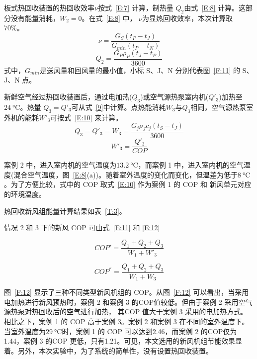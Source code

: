 板式热回收装置的热回收效率$\nu$按式~\ref{E:7} 计算，制热量 $Q_2$由式~\ref{E:8} 计算。这部分没有能量消耗，$W_2 = 0$。在式~\ref{E:8} 中， $\nu$为显热回收效率，本次计算取 70\%。
\begin{equation}\label{E:7}
	\nu = \frac{G_S (t_P - t_J)}{G_{min} (t_P - t_N)} 
\end{equation}
\begin{equation}\label{E:8}
	Q_2 = \frac{G_P \rho_P (t_J - t_P)}{3600} 
\end{equation}
式中，$G_{min}$是送风量和回风量的最小值，小标 S、J、N 分别代表图~\ref{F:11} 的 S、J、N 点。

新鲜空气经过热回收装置后，通过电加热($Q_3$)或空气源热泵室内机($Q'_3$)加热至$\qty{24}{\degreeCelsius} $。热量 $Q_3 = Q'_3 $可从式~\ref{9}中计算。点热能消耗$W_3$与$Q_3$相同，空气源热泵室外机的能耗$W'_3$可按式~\ref{E:10} 来计算。
\begin{equation}\label{E:9}
	Q_3 = Q'_3 = W_3 = \frac{G_j \rho_J c_j(t_S - t_J)}{3600} 
\end{equation}
\begin{equation}\label{E:10}
	W'_3 = \frac{Q'_3}{COP} 
\end{equation}

案例 2 中，进入室内机的空气温度为$\qty{13.2}{\degreeCelsius} $，而案例 1 中，进入室内机的空气温度(混合空气温度，图~\ref{E:8}(a))。随着室外温度的变化而变化，但温差为低于$\qty{8}{\degreeCelsius} $。为了方便比较，式中的 COP 取式~\ref{E:10} 作为案例 1 的 COP 和 新风单元对应的环境温度。

热回收新风组能量计算结果如表~\ref{T:3}。

情况 2 和 3 下的新风 COP 可由式~\ref{E:11} 和 \ref{E:12}

\begin{equation}\label{E:11}
	COP' = \frac{Q_1 + Q_2 + Q_3}{W_1 + W'_3} 
\end{equation}

\begin{equation}\label{E:12}
	COP^{''} = \frac{Q_1 + Q_2 + Q_3}{W_1 + W_3} 
\end{equation}

图~\ref{F:12} 显示了三种不同类型新风机组的 COP。从图~\ref{F:12} 可以看出，当采用电加热进行新风预热时，案例 2 和案例 3 的COP值较低。但由于案例 2 采用空气源热泵对热回收后的空气进行加热， 其COP 值大于案例 3 采用的电加热方式。相比之下，案例 1 的 COP 高于案例 3。案例 2 和案例 3 在不同的室外温度下。当室外温度为$\qty{29}{\degreeCelsius} $时，案例 1 的 COP 可以达到2.46，而案例 2 的COP仅为1.44，案例 3 的COP 更低，只有1.21。可见，本文选用的新风机组节能效果显着。另外，本次实验中，为了系统的简单性，没有设置热回收装置。

